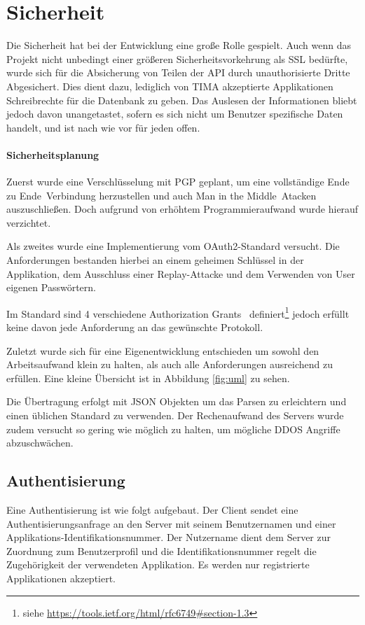\section{Sicherheit}
Die Sicherheit hat bei der Entwicklung eine große Rolle gespielt.  Auch wenn
das Projekt nicht unbedingt einer größeren Sicherheitsvorkehrung als SSL
bedürfte, wurde sich für die Absicherung von Teilen der API durch
unauthorisierte Dritte Abgesichert. Dies dient dazu, lediglich von TIMA
akzeptierte Applikationen Schreibrechte für die Datenbank zu geben.  Das Auslesen
der Informationen bliebt jedoch davon unangetastet, sofern es sich nicht um Benutzer spezifische Daten handelt, und ist nach wie vor für
jeden offen.

\paragraph{Sicherheitsplanung}
Zuerst wurde eine Verschlüsselung mit PGP geplant, um eine
vollständige \glqq Ende zu Ende\grqq~Verbindung herzustellen und auch \glqq Man
in the Middle\grqq~Atacken auszuschließen. Doch aufgrund von erhöhtem
Programmieraufwand wurde hierauf verzichtet.

Als zweites wurde eine Implementierung vom OAuth2-Standard versucht.
Die Anforderungen bestanden hierbei an einem geheimen Schlüssel in der
Applikation, dem Ausschluss einer Replay-Attacke und dem Verwenden von
User eigenen Passwörtern.

Im Standard sind 4 verschiedene \glqq Authorization Grants\grqq~
definiert\footnote{siehe \url{https://tools.ietf.org/html/rfc6749\#section-1.3}}
jedoch erfüllt keine davon jede Anforderung an das gewünschte Protokoll.

Zuletzt wurde sich für eine Eigenentwicklung entschieden um sowohl den Arbeitsaufwand
klein zu halten, als auch alle Anforderungen ausreichend zu erfüllen.
Eine kleine Übersicht ist in Abbildung \ref{fig:uml} zu sehen.

Die Übertragung erfolgt mit JSON Objekten um das Parsen zu erleichtern und
einen üblichen Standard zu verwenden. Der Rechenaufwand des Servers wurde
zudem versucht so gering wie möglich zu halten, um mögliche DDOS Angriffe
abzuschwächen.

\subsection{Authentisierung}
Eine Authentisierung ist wie folgt aufgebaut.
Der Client sendet eine Authentisierungsanfrage an den Server mit seinem
Benutzernamen und einer Applikations-Identifikationsnummer. Der Nutzername
dient dem Server zur Zuordnung zum Benutzerprofil und die Identifikationsnummer
regelt die Zugehörigkeit der verwendeten Applikation. Es werden nur registrierte
Applikationen akzeptiert.

